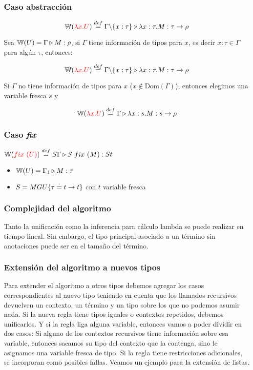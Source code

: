 \subsubsection{Caso abstracción}
$$\mathbb{W}({\color{red}\lambda x. U}) \overset{def}{=} \Gamma \backslash\{x:\tau\}\triangleright \lambda x: \tau . M : \tau\to\rho$$


Sea $\mathbb{W}(U) = \Gamma\triangleright M : \rho$, si $\Gamma$ tiene información de tipos para $x$, es decir $x:\tau\in\Gamma$ para algún $\tau$, entonces:

$$\mathbb{W}({\color{red}\lambda x. U}) \overset{def}{=} \Gamma \backslash\{x:\tau\}\triangleright \lambda x: \tau . M : \tau\to\rho$$

Si $\Gamma$ no tiene información de tipos para $x$ ($x\notin \text{Dom}(\Gamma)$), entonces elegimos una variable fresca $s$ y

$$\mathbb{W}({\color{red}\lambda x. U}) \overset{def}{=} \Gamma\triangleright \lambda x: s . M : s\to\rho$$

\subsubsection{Caso \textit{fix}}
$\mathbb{W}({\color{red}fix~(U)}) \overset{def}{=} S\Gamma\triangleright S~fix~(M) : St$
\begin{centrado}
\begin{itemize}
\item $\mathbb{W}(U) = \Gamma_1\triangleright M : \tau$
\item $S = MGU\{\tau\overset{\cdot}{=} t\to t\}$ con $t$ variable fresca
\end{itemize}
\end{centrado}

\subsubsection{Complejidad del algoritmo}
Tanto la unificación como la inferencia para cálculo lambda se puede realizar en tiempo lineal. Sin embargo, el tipo principal asociado a un término sin anotaciones puede ser  en el tamaño del término.

\subsubsection{Extensión del algoritmo a nuevos tipos}
Para extender el algoritmo a otros tipos debemos agregar los casos correspondientes al nuevo tipo teniendo en cuenta que los llamados recursivos devuelven un contexto, un término y un tipo sobre los que no podemos asumir nada.
Si la nueva regla tiene tipos iguales o contextos repetidos, debemos unificarlos. Y si la regla liga alguna variable, entonces vamos a poder dividir en dos casos: 
Si alguno de los contextos recursivos tiene información sobre esa variable, entonces sacamos su tipo del contexto que la contenga, sino le asignamos una variable fresca de tipo. Si la regla tiene restricciones adicionales, se incorporan como posibles fallas. Veamos un ejemplo para la extensión de listas.

